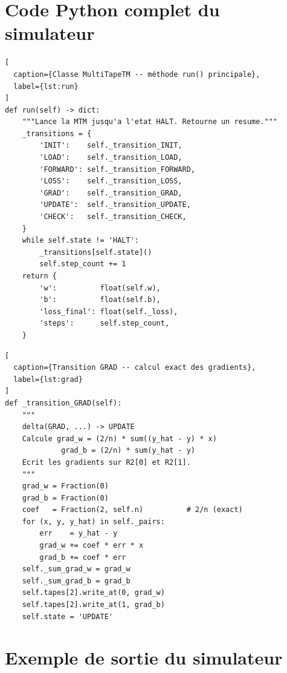 \documentclass[12pt, a4paper, oneside]{report}
\begin{document}
\chapter{Code Python complet du simulateur}

\begin{lstlisting}[
  caption={Classe MultiTapeTM -- méthode run() principale},
  label={lst:run}
]
def run(self) -> dict:
    """Lance la MTM jusqu'a l'etat HALT. Retourne un resume."""
    _transitions = {
        'INIT':    self._transition_INIT,
        'LOAD':    self._transition_LOAD,
        'FORWARD': self._transition_FORWARD,
        'LOSS':    self._transition_LOSS,
        'GRAD':    self._transition_GRAD,
        'UPDATE':  self._transition_UPDATE,
        'CHECK':   self._transition_CHECK,
    }
    while self.state != 'HALT':
        _transitions[self.state]()
        self.step_count += 1
    return {
        'w':          float(self.w),
        'b':          float(self.b),
        'loss_final': float(self._loss),
        'steps':      self.step_count,
    }
\end{lstlisting}

\begin{lstlisting}[
  caption={Transition GRAD -- calcul exact des gradients},
  label={lst:grad}
]
def _transition_GRAD(self):
    """
    delta(GRAD, ...) -> UPDATE
    Calcule grad_w = (2/n) * sum((y_hat - y) * x)
             grad_b = (2/n) * sum(y_hat - y)
    Ecrit les gradients sur R2[0] et R2[1].
    """
    grad_w = Fraction(0)
    grad_b = Fraction(0)
    coef   = Fraction(2, self.n)          # 2/n (exact)
    for (x, y, y_hat) in self._pairs:
        err    = y_hat - y
        grad_w += coef * err * x
        grad_b += coef * err
    self._sum_grad_w = grad_w
    self._sum_grad_b = grad_b
    self.tapes[2].write_at(0, grad_w)
    self.tapes[2].write_at(1, grad_b)
    self.state = 'UPDATE'
\end{lstlisting}

\chapter{Exemple de sortie du simulateur}
\end{document}
